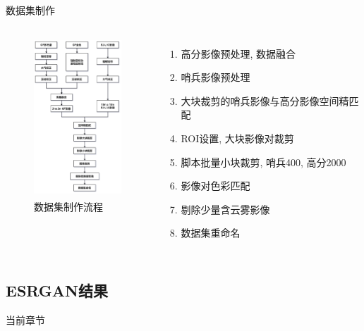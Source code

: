 \begin{frame}{数据集制作}
    \begin{columns}
        \begin{figure}
            \centering
            \includegraphics[height=6cm]{pic/chap0201.png}
            \caption{数据集制作流程}
            \label{fig:0201}
        \end{figure}

        \begin{enumerate}
            \item 高分影像预处理, 数据融合
            \item 哨兵影像预处理
            \item 大块裁剪的哨兵影像与高分影像空间精匹配
            \item ROI设置, 大块影像对裁剪
            \item 脚本批量小块裁剪, 哨兵400, 高分2000
            \item 影像对色彩匹配
            \item 剔除少量含云雾影像
            \item 数据集重命名
        \end{enumerate}
    \end{columns}
    
\end{frame}

\subsection{ESRGAN结果}

\begin{frame}{当前章节}
\end{frame}

